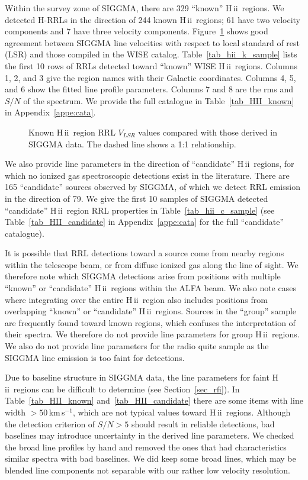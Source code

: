 \documentclass[manuscript]{aastex61}
\newcommand{\hii}{{\rm H\,}{{\sc ii}}}
\newcommand{\kms}{\,km\,s$^{-1}$}
\begin{document}
Within the survey zone of SIGGMA, there are 329 ``known'' \hii\ regions.
We detected H-RRLs in the direction of 244 known \hii\ regions; 61 have two velocity components and 7 have three velocity components.
Figure~\ref{vlsr_map} shows good agreement between SIGGMA line velocities with respect to local standard of rest (LSR) and those compiled in the WISE catalog.
Table~\ref{tab_hii_k_sample} lists the first 10 rows of RRLs detected toward ``known'' WISE \hii\ regions.
Columns 1, 2, and 3 give the region names with their Galactic coordinates.
Columns 4, 5, and 6 show the fitted line profile parameters. 
Columns 7 and 8 are the rms and $S/N$ of the spectrum.
We provide the full catalogue in Table~\ref{tab_HII_known} in Appendix~\ref{appe:cata}.

\begin{figure}[htbp]
\caption{Known \hii\ region RRL $V_{LSR}$ values compared with
those derived in SIGGMA data.  The dashed line shows a 1:1 relationship.}\label{vlsr_map}
\end{figure}

We also provide line parameters in the direction of ``candidate'' \hii\ regions, for which no ionized gas spectroscopic detections exist in the literature.
There are 165 ``candidate'' sources observed by SIGGMA, of which we detect RRL emission in the direction of 79.
We give the first 10 samples of SIGGMA detected ``candidate'' \hii\ region RRL properties in Table~\ref{tab_hii_c_sample} (see Table~\ref{tab_HII_candidate} in Appendix~\ref{appe:cata} for the full ``candidate'' catalogue).

It is possible that RRL detections toward a source come from nearby regions within the telescope beam, or from diffuse ionized gas along the line of sight.
We therefore note which SIGGMA detections arise from positions with multiple ``known'' or ``candidate'' \hii\ regions within the ALFA beam.
We also note cases where integrating over the entire \hii\ region also includes positions from overlapping ``known'' or ``candidate'' \hii\ regions.
Sources in the ``group'' sample are frequently found toward known regions, which confuses the interpretation of their spectra.
We therefore do not provide line parameters for group \hii\ regions.
We also do not provide line parameters for the radio quite sample as the SIGGMA line emission is too faint for detections.

Due to baseline structure in SIGGMA data, the line parameters for faint \hii\ regions can be difficult to determine (see Section~\ref{sec_rfi}).
In Table~\ref{tab_HII_known} and~\ref{tab_HII_candidate} there are some items with line width $>50$\kms, which are not typical values toward \hii\ regions. 
Although the detection criterion of $S/N >5$ should result in reliable detections, bad baselines may introduce uncertainty in the derived line parameters.
We checked the broad line profiles by hand and removed the ones that had characteristics similar spectra with bad baselines.
We did keep some broad lines, which may be blended line components not separable with our rather low velocity resolution.
\end{document}
